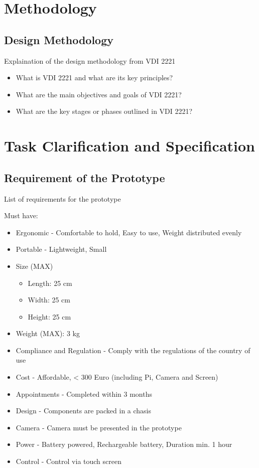 \chapter{Methodology}

\section{Design Methodology}
Explaination of the design methodology from VDI 2221 \cite{Klaus13}

\begin{itemize}
    \item What is VDI 2221 and what are its key principles?
    \item What are the main objectives and goals of VDI 2221?
    \item What are the key stages or phases outlined in VDI 2221?
\end{itemize}


\chapter{Task Clarification and Specification}
\section{Requirement of the Prototype}
\label{sec:requirement}
List of requirements for the prototype

Must have:
\begin{itemize}
    \item Ergonomic - Comfortable to hold, Easy to use, Weight distributed evenly
    \item Portable - Lightweight, Small
    \item Size (MAX)
          \begin{itemize}
              \item Length: 25 cm
              \item Width: 25 cm
              \item Height: 25 cm
          \end{itemize}
    \item Weight (MAX): 3 kg
    \item Compliance and Regulation - Comply with the regulations of the country of use
    \item Cost - Affordable, < 300 Euro (including Pi, Camera and Screen)
    \item Appointments - Completed within 3 months
    \item Design - Components are packed in a chasis
    \item Camera - Camera must be presented in the prototype
    \item Power - Battery powered, Rechargeable battery, Duration min. 1 hour
    \item Control - Control via touch screen
\end{itemize}

